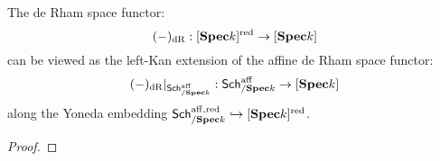                \begin{proposition} \label{prop: gluing_affine_de_rham_spaces}
                    The de Rham space functor:
                        $$(-)_{\mathrm{dR}}: [\mathbf{Spec} k]^{\mathrm{red}} \to [\mathbf{Spec} k]$$
                    can be viewed as the left-Kan extension of the affine de Rham space functor:
                        $$(-)_{\mathrm{dR}}|_{\mathsf{Sch}^{\mathrm{aff}}_{/\mathbf{Spec} k}}: \mathsf{Sch}^{\mathrm{aff}}_{/\mathbf{Spec} k} \to [\mathbf{Spec} k]$$
                    along the Yoneda embedding $\mathsf{Sch}^{\mathrm{aff}, \mathrm{red}}_{/\mathbf{Spec} k} \hookrightarrow [\mathbf{Spec} k]^{\mathrm{red}}$. 
                \end{proposition}
                    \begin{proof}
                        
                    \end{proof}
                    
